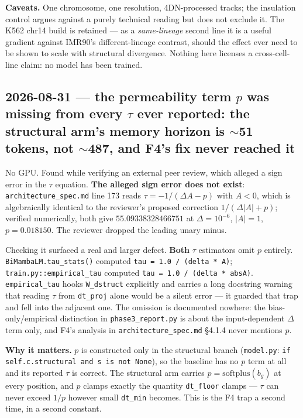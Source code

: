 \documentclass[11pt,a4paper]{article}
\newcommand{\code}[1]{\texttt{\small #1}}
\begin{document}
\textbf{Caveats.} One chromosome, one resolution, 4DN-processed tracks; the
insulation control argues against a purely technical reading but does not
exclude it. The K562 chr14 build is retained --- as a \emph{same-lineage}
second line it is a useful gradient against IMR90's different-lineage contrast,
should the effect ever need to be shown to scale with structural divergence.
Nothing here licenses a cross-cell-line claim: no model has been trained.

\subsection*{2026-08-31 --- the permeability term $p$ was missing from every
$\tau$ ever reported: the structural arm's memory horizon is $\sim$51 tokens,
not $\sim$487, and F4's fix never reached it}

No GPU. Found while verifying an external peer review, which alleged a sign
error in the $\tau$ equation. \textbf{The alleged sign error does not exist}:
\code{architecture\_spec.md} line 173 reads $\tau = -1/(\Delta A - p)$ with
$A < 0$, which is algebraically identical to the reviewer's proposed
correction $1/(\Delta|A| + p)$; verified numerically, both give
$55.09338328466751$ at $\Delta = 10^{-6}$, $|A| = 1$, $p = 0.018150$. The
reviewer dropped the leading unary minus.

Checking it surfaced a real and larger defect. \textbf{Both} $\tau$ estimators
omit $p$ entirely. \code{BiMambaLM.tau\_stats()} computed
\code{tau = 1.0 / (delta * A)}; \code{train.py::empirical\_tau} computed
\code{tau = 1.0 / (delta * absA)}. \code{empirical\_tau} hooks
\code{W\_dstruct} explicitly and carries a long docstring warning that reading
$\tau$ from \code{dt\_proj} alone would be a silent error --- it guarded that
trap and fell into the adjacent one. The omission is documented nowhere: the
bias-only/empirical distinction in \code{phase3\_report.py} is about the
input-dependent $\Delta$ term only, and F4's analysis in
\code{architecture\_spec.md} \S4.1.4 never mentions $p$.

\textbf{Why it matters.} $p$ is constructed only in the structural branch
(\code{model.py}: \code{if self.c.structural and s is not None}), so the
baseline has no $p$ term at all and its reported $\tau$ is correct. The
structural arm carries $p = \mathrm{softplus}(b_g)$ at every position, and $p$
clamps exactly the quantity \code{dt\_floor} clamps --- $\tau$ can never exceed
$1/p$ however small \code{dt\_min} becomes. This is the F4 trap a second time,
in a second constant.
\end{document}

